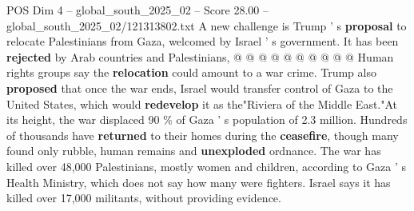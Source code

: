 \begin{textsample}{POS Dim 4 – global\_south\_2025\_02 – Score 28.00 – global\_south\_2025\_02/121313802.txt}
A new challenge is Trump ' s \textbf{proposal} to relocate Palestinians from Gaza, welcomed by Israel ' s government.
It has been \textbf{rejected} by Arab countries and Palestinians, @ @ @ @ @ @ @ @ @ @ Human rights groups say the \textbf{relocation} could amount to a war crime.
Trump also \textbf{proposed} that once the war ends, Israel would transfer control of Gaza to the United States, which would \textbf{redevelop} it as the"Riviera of the Middle East."At its height, the war displaced 90 \% of Gaza ' s population of 2.3 million.
Hundreds of thousands have \textbf{returned} to their homes during the \textbf{ceasefire}, though many found only rubble, human remains and \textbf{unexploded} ordnance.
The war has killed over 48,000 Palestinians, mostly women and children, according to Gaza ' s Health Ministry, which does not say how many were fighters.
Israel says it has killed over 17,000 militants, without providing evidence.

\end{textsample}
